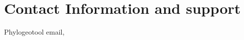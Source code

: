 \documentclass[a4paper, 11pt]{article} %
\begin{document}
\section{Contact Information and support }

Phylogeotool email, 






\end{document}
